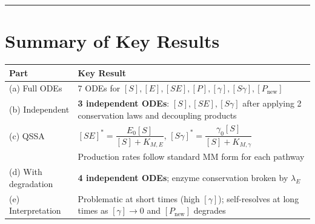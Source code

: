 \documentclass[12pt]{article}
\newcommand{\KME}{K_{M,E}}
\newcommand{\KMg}{K_{M,\gamma}}
\begin{document}
\vspace{2em}
\hrule
\vspace{1em}


\section*{Summary of Key Results}

\renewcommand{\arraystretch}{1.5}
\begin{center}
\begin{tabular}{@{}p{3.5cm} p{10cm}@{}}
\toprule
\textbf{Part} & \textbf{Key Result} \\
\midrule
(a) Full ODEs & 7 ODEs for $[S],[E],[SE],[P],[\gamma],[S\gamma],[P_{\text{new}}]$ \\
(b) Independent & \textbf{3 independent ODEs}: $[S],[SE],[S\gamma]$ after applying 2 conservation laws and decoupling products \\
(c) QSSA & $[SE]^* = \dfrac{E_0[S]}{[S]+\KME}$, \quad $[S\gamma]^* = \dfrac{\gamma_0[S]}{[S]+\KMg}$ \\
& Production rates follow standard MM form for each pathway \\
(d) With degradation & \textbf{4 independent ODEs}; enzyme conservation broken by $\lambda_E$ \\
(e) Interpretation & Problematic at short times (high $[\gamma]$); self-resolves at long times as $[\gamma]\to 0$ and $[P_{\text{new}}]$ degrades \\
\bottomrule
\end{tabular}
\end{center}
\end{document}

